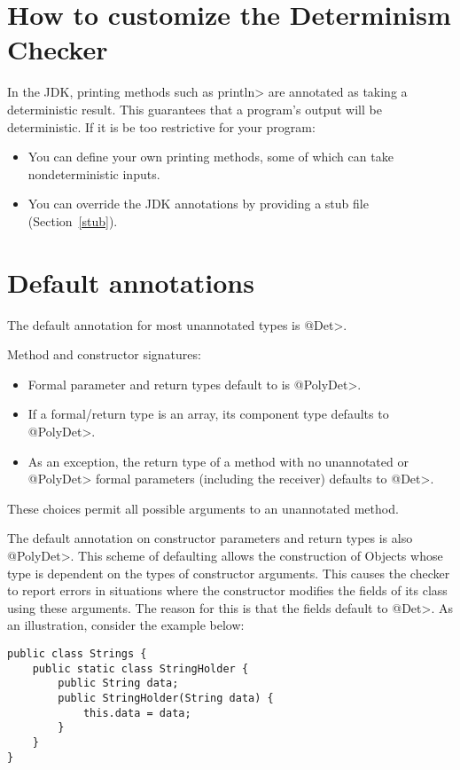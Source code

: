 \section{How to customize the Determinism Checker\label{determinism-customization}}

In the JDK, printing methods such as \<println> are annotated as taking a
deterministic result.  This guarantees that a program's output will be
deterministic.  If it is be too restrictive for your program:
\begin{itemize}
\item
  You can define your own printing methods, some of which can take
  nondeterministic inputs.
\item
  You can override the JDK annotations by providing a stub file
  (Section~\ref{stub}).
\end{itemize}


\section{Default annotations\label{determinism-defaults}}

The default annotation for most unannotated types is \<@Det>.

Method and constructor signatures:
\begin{itemize}
\item
  Formal parameter and return types default to is \<@PolyDet>.
\item
  If a formal/return type is an array, its component type defaults to
  \<@PolyDet>.
\item
  As an exception, the return type of a method with no unannotated or
  \<@PolyDet> formal parameters (including the receiver) defaults to
  \<@Det>.
\end{itemize}

These choices permit all possible arguments to an unannotated method.

The default annotation on constructor parameters and return types is also \<@PolyDet>.
This scheme of defaulting allows the construction of Objects whose type
is dependent on the types of constructor arguments. This causes the checker
to report errors in situations where the constructor modifies the fields of its class
using these arguments. The reason for this is that the fields default to \<@Det>.
As an illustration, consider the example below:

\begin{Verbatim}
public class Strings {
    public static class StringHolder {
        public String data;
        public StringHolder(String data) {
            this.data = data;
        }
    }
}
\end{Verbatim}

